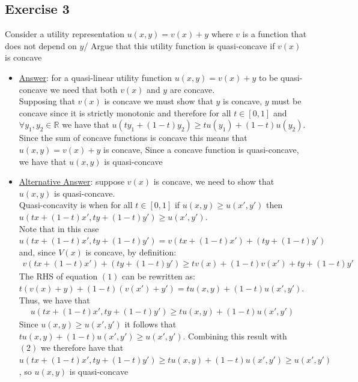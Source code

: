\documentclass{article}
\begin{document}
\par
\vspace{6mm}
\subsection{Exercise 3}
Consider a utility representation $u(x,y) = v(x) + y$ where $v$ is a function that does not depend on $y$/ Argue that this utility function is quasi-concave if $v(x)$ is concave\par \vspace{0.3em}
\begin{itemize}
  \item  \underline{Answer}: for a quasi-linear utility function $u(x,y) = v(x) + y$ to be quasi-concave we need that both $v(x)$ and $y$ are concave.\\ Supposing that $v(x)$ is concave we must show that $y$ is concave, $y$ must be concave since it is strictly monotonic and therefore for all $t \in [0,1]$ and $\forall y_{1},y_{2} \in \mathbb{R}$ we have that $u(ty_{1} + (1-t)y_{2}) \geq tu(y_{1}) + (1-t)u(y_{2})$.\\ Since the sum of concave functions is concave this means that $u(x,y) = v(x) + y$ is concave, Since a concave function is quasi-concave, we have that $u(x,y)$ is quasi-concave
  \item  \underline{Alternative Answer}: suppose $v(x)$ is concave, we need to show that $u(x,y)$ is quasi-concave.\\ Quasi-concavity is when for all $t \in [0,1]$ if $u(x,y) \geq u(x',y')$ then $u(tx + (1-t)x', ty + (1-t)y') \geq u(x', y')$.\\ Note that in this case $u(tx + (1-t)x', ty + (1-t)y') = v(tx + (1-t)x') + (ty + (1-t)y')$ and, since $V(x)$ is concave, by definition:
  \begin{gather*}
    v(tx + (1-t)x') + (ty + (1-t)y') \geq tv(x) + (1-t) v(x') + ty + (1-t)y' \ \tag{1}
  \end{gather*}
  The RHS of equation $(1)$ can be rewritten as: $t(v(x) + y) + (1-t)(v(x')+y') = tu(x,y) + (1-t)u(x',y')$. Thus, we have that
  \begin{gather*}
    u(tx + (1-t)x', ty + (1-t)y') \geq tu(x,y) + (1-t)u(x',y') \ \tag{2}
  \end{gather*}
  Since $u(x,y) \geq u(x',y')$ it follows that $tu(x,y) + (1-t)u(x',y') \geq u(x',y')$. Combining this result with $(2)$ we therefore have that $u(tx + (1-t)x', ty + (1-t)y') \geq tu(x,y) + (1-t)u(x',y') \geq u(x', y')$, so $u(x,y)$ is quasi-concave
\end{itemize}
\par
\vspace{6mm}
\end{document}
